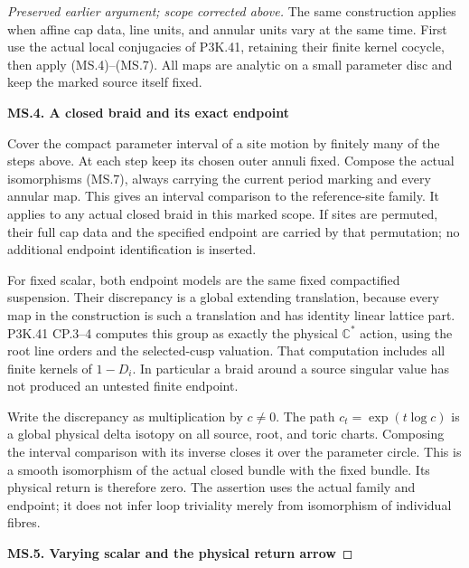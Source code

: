 \begin{proof}[Preserved earlier argument; scope corrected above]
The same construction applies when affine cap data, line units, and
annular units vary at the same time. First use the actual local
conjugacies of P3K.41, retaining their finite kernel cocycle, then
apply (MS.4)--(MS.7). All maps are analytic on a small parameter disc
and keep the marked source itself fixed.

\par

\medskip\noindent\textbf{MS.4. A closed braid and its exact endpoint}

\par\nobreak

Cover the compact parameter interval of a site motion by finitely many
of the steps above. At each step keep its chosen outer annuli fixed.
Compose the actual isomorphisms (MS.7), always carrying the current
period marking and every annular map. This gives an interval
comparison to the reference-site family. It applies to any actual
closed braid in this marked scope. If sites are permuted, their full
cap data and the specified endpoint are carried by that permutation;
no additional endpoint identification is inserted.

For fixed scalar, both endpoint models are the same fixed compactified
suspension. Their discrepancy is a global extending translation,
because every map in the construction is such a translation and
has identity linear lattice part. P3K.41 CP.3--4 computes this group
as exactly the physical \(\mathbb C^*\) action, using the root
line orders and the selected-cusp valuation. That computation includes
all finite kernels of \(1-D_i\). In particular a braid around
a source singular value has not produced an untested finite endpoint.

Write the discrepancy as multiplication by \(c\ne0\). The
path \(c_t=\exp(t\log c)\) is a global physical delta isotopy
on all source, root, and toric charts. Composing the interval
comparison with its inverse closes it over the parameter circle.
This is a smooth isomorphism of the actual closed bundle with the
fixed bundle. Its physical return is therefore zero. The assertion
uses the actual family and endpoint; it does not infer loop
triviality merely from isomorphism of individual fibres.

\par

\medskip\noindent\textbf{MS.5. Varying scalar and the physical return arrow}

\par\nobreak


\end{proof}
